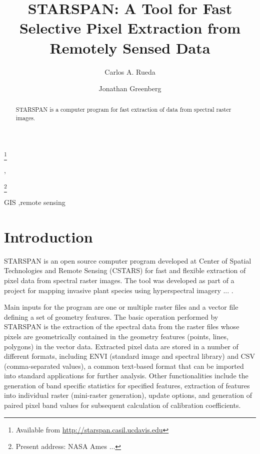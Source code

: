 \documentclass{elsart}
\newcommand{\starspan}{STARSPAN{}}
\begin{document}
\begin{frontmatter}

\title{\starspan: 
A Tool for Fast Selective Pixel Extraction 
from Remotely Sensed Data}
\thanks[label1]{Available from \url{http://starspan.casil.ucdavis.edu}}

\author{Carlos A. Rueda},
\author{Jonathan Greenberg}
\thanks[greenberg]{Present address: NASA Ames ...}

\address{Center for Spatial Technologies and Remote Sensing (CSTARS).
The Barn. University of California, Davis. One Shields Avenue, Davis, CA 95616}





\begin{abstract}
	
	\starspan{} is a computer program for fast extraction of data from spectral
	raster images.
	
\end{abstract}

\begin{keyword}
GIS \sep remote sensing
\end{keyword}

\end{frontmatter}


\section{Introduction}\label{intro}

	\starspan{} is an open source computer program developed at Center of Spatial
	Technologies and Remote Sensing (CSTARS) for fast and flexible extraction of
	pixel data from spectral raster images. The tool was developed as part
	of a project for mapping invasive plant species using hyperspectral
	imagery ... \citep{ustin04}.
	
	Main inputs for the program are one or multiple raster files and a vector
	file defining a set of geometry features. The basic operation performed by
	\starspan{} is the extraction of the spectral data from the raster files
	whose pixels are geometrically contained in the geometry features (points,
	lines, polygons) in the vector data. Extracted pixel data are stored in a
	number of different formats, including ENVI \citep{envi} (standard image and
	spectral library) and CSV (comma-separated values), a common text-based
	format that can be imported into standard applications for further analysis.
	Other functionalities include the generation of band specific statistics for
	specified features, extraction of features into individual raster
	(mini-raster generation), update options, and generation of paired pixel
	band values for subsequent calculation of calibration coefficients.
	
\end{document}
